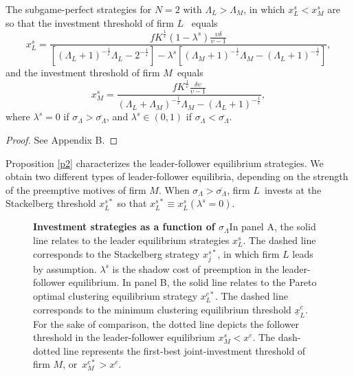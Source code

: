 \documentclass[nogrid,nosurname,sort&compress]{RFS}
\begin{document}
\begin{proposition}\label{p2}
The subgame-perfect strategies for $N=2$ with $\Lambda _{L}>\Lambda _{M}$, in
which $x_{L}^{s}<x_{M}^{s}$ are so that the investment threshold of firm $L$%
\ equals%
\begin{equation}
x_{L}^{s}=\frac{fK^{\frac{1}{\varepsilon }}\left( 1-\lambda ^{s}\right)
\frac{\upsilon \delta }{\upsilon -1}}{\left[ \left( \Lambda _{L}+1\right) ^{-%
\frac{1}{\varepsilon }}\Lambda _{L}-2^{-\frac{1}{\varepsilon }}\right]
-\lambda ^{s}\left[ \left( \Lambda _{M}+1\right) ^{-\frac{1}{\varepsilon }%
}\Lambda _{M}-\left( \Lambda _{L}+1\right) ^{-\frac{1}{\varepsilon }}\right]
},  \label{xm}
\end{equation}
\noindent and the investment threshold of firm $M$\ equals%
\begin{equation}
x_{M}^{s}=\frac{fK^{\frac{1}{\varepsilon }}\frac{\delta \upsilon }{\upsilon
-1}}{\left( \Lambda _{L}+\Lambda _{M}\right) ^{-\frac{1}{\varepsilon }%
}\Lambda _{M}-\left( \Lambda _{L}+1\right) ^{-\frac{1}{\varepsilon }}},
\label{xl}
\end{equation}
\noindent where $\lambda ^{s}=0$ if $\sigma _{\Lambda }>\overline{\sigma _{\Lambda }}$, and
$\lambda ^{s}\in \left( 0,1\right) $ if $\sigma _{\Lambda }<\overline{\sigma _{\Lambda }}$.
\end{proposition}
\begin{proof}
See Appendix B.
\end{proof}

Proposition \ref{p2} characterizes the leader-follower equilibrium strategies. We obtain two
different types of leader-follower equilibria, depending on the strength of the preemptive motives
of firm $M$. When $\sigma _{\Lambda }>\overline{\sigma _{\Lambda }}$, firm $L$\ invests at the
Stackelberg threshold $x_{L}^{s\ast }$ so that $x_{L}^{s\ast }\equiv x_{L}^{s}\left( \lambda
^{s}=0\right) $.


\begin{figure}[!t]%
\caption{\label{f1}\textbf{Investment strategies as a function of $\sigma _{\Lambda }$}\newline In
panel A, the solid line relates to the leader equilibrium strategies $x_{L}^{s}$. The dashed line
corresponds to the Stackelberg strategy $x_{j}^{s\ast }$, in which firm $L$ leads by assumption.
$\lambda ^{s}$ is the shadow cost of preemption in the leader-follower equilibrium. In panel B,
the solid line relates to the Pareto optimal clustering equilibrium strategy $x_{L}^{c\ast }.$ The
dashed line corresponds to the minimum clustering equilibrium threshold $\underline{x}_{L}^{c}$.
For the sake of comparison, the dotted line depicts the follower threshold in the leader-follower
equilibrium $x_{M}^{s}<x^{c}.$ The dash-dotted line represents the first-best joint-investment
threshold of firm $M$, or\ $x_{M}^{c\ast }>x^{c}$.}
\end{figure}
\end{document}
